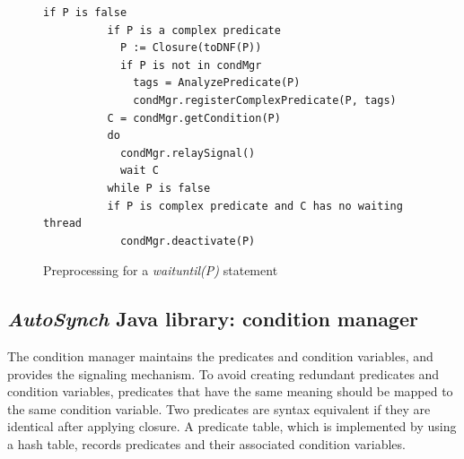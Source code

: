 \documentclass{sigplanconf}
\begin{document}
\begin{figure}[ht!]
    \begin{Verbatim}[fontsize=\footnotesize,gobble=8,frame=lines,
            framesep=3mm]
        if P is false 
          if P is a complex predicate 
            P := Closure(toDNF(P))
            if P is not in condMgr
              tags = AnalyzePredicate(P)
              condMgr.registerComplexPredicate(P, tags)
          C = condMgr.getCondition(P)
          do 
            condMgr.relaySignal()
            wait C
          while P is false
          if P is complex predicate and C has no waiting thread
            condMgr.deactivate(P) 
    \end{Verbatim}
    \caption{Preprocessing for a {\em waituntil(P)} statement}
  \label{fig:prep}
\end{figure}  


%
%


\subsection{{\em AutoSynch} Java library: condition manager}
The condition manager maintains the predicates and condition variables, and
provides the signaling mechanism. To avoid creating redundant predicates and 
condition variables, predicates that have the same meaning should be mapped to 
the same condition variable. Two predicates are syntax equivalent if they 
are identical after applying closure. A predicate table, which is implemented 
by using a
hash table, records predicates and their associated condition variables. 
\end{document}
